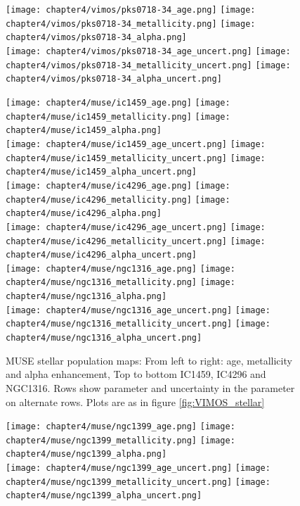 \begin{figure}
	\centering
	\texttt{[image: chapter4/vimos/pks0718-34\_age.png]}
	\texttt{[image: chapter4/vimos/pks0718-34\_metallicity.png]}
	\texttt{[image: chapter4/vimos/pks0718-34\_alpha.png]}
	\\
	\texttt{[image: chapter4/vimos/pks0718-34\_age\_uncert.png]}
	\texttt{[image: chapter4/vimos/pks0718-34\_metallicity\_uncert.png]}
	\texttt{[image: chapter4/vimos/pks0718-34\_alpha\_uncert.png]}
	\\
\end{figure}

\begin{figure}
	\centering
	\texttt{[image: chapter4/muse/ic1459\_age.png]}
	\texttt{[image: chapter4/muse/ic1459\_metallicity.png]}
	\texttt{[image: chapter4/muse/ic1459\_alpha.png]}
	\\
	\texttt{[image: chapter4/muse/ic1459\_age\_uncert.png]}
	\texttt{[image: chapter4/muse/ic1459\_metallicity\_uncert.png]}
	\texttt{[image: chapter4/muse/ic1459\_alpha\_uncert.png]}
	\\
	\texttt{[image: chapter4/muse/ic4296\_age.png]}
	\texttt{[image: chapter4/muse/ic4296\_metallicity.png]}
	\texttt{[image: chapter4/muse/ic4296\_alpha.png]}
	\\
	\texttt{[image: chapter4/muse/ic4296\_age\_uncert.png]}
	\texttt{[image: chapter4/muse/ic4296\_metallicity\_uncert.png]}
	\texttt{[image: chapter4/muse/ic4296\_alpha\_uncert.png]}
	\\
	\texttt{[image: chapter4/muse/ngc1316\_age.png]}
	\texttt{[image: chapter4/muse/ngc1316\_metallicity.png]}
	\texttt{[image: chapter4/muse/ngc1316\_alpha.png]}
	\\
	\texttt{[image: chapter4/muse/ngc1316\_age\_uncert.png]}
	\texttt{[image: chapter4/muse/ngc1316\_metallicity\_uncert.png]}
	\texttt{[image: chapter4/muse/ngc1316\_alpha\_uncert.png]}
	\\
	\caption[MUSE stellar population maps]{MUSE stellar population maps: From left to right: age, metallicity and alpha enhancement, Top to bottom IC1459, IC4296 and NGC1316. Rows show parameter and uncertainty in the parameter on alternate rows. Plots are as in figure \ref{fig:VIMOS_stellar}}
\end{figure}

\begin{figure}
	\centering
	\texttt{[image: chapter4/muse/ngc1399\_age.png]}
	\texttt{[image: chapter4/muse/ngc1399\_metallicity.png]}
	\texttt{[image: chapter4/muse/ngc1399\_alpha.png]}
	\\
	\texttt{[image: chapter4/muse/ngc1399\_age\_uncert.png]}
	\texttt{[image: chapter4/muse/ngc1399\_metallicity\_uncert.png]}
	\texttt{[image: chapter4/muse/ngc1399\_alpha\_uncert.png]}
	\\
\end{figure}